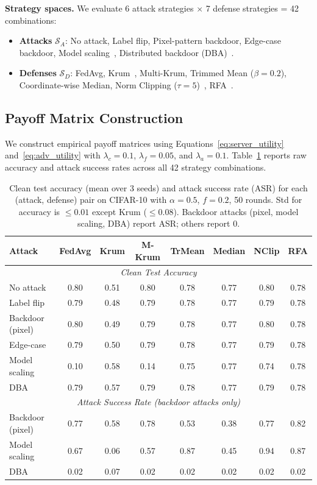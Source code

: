 \documentclass{article}
\newcommand{\SA}{\mathcal{S}_A}
\newcommand{\SD}{\mathcal{S}_D}
\begin{document}
\textbf{Strategy spaces.} We evaluate 6 attack strategies $\times$ 7 defense strategies = 42 combinations:
\begin{itemize}
    \item \textbf{Attacks} $\SA$: No attack, Label flip, Pixel-pattern backdoor, Edge-case backdoor, Model scaling~\citep{bagdasaryan2020backdoor}, Distributed backdoor (DBA)~\citep{xie2019dba}.
    \item \textbf{Defenses} $\SD$: FedAvg, Krum~\citep{blanchard2017machine}, Multi-Krum, Trimmed Mean ($\beta=0.2$), Coordinate-wise Median, Norm Clipping ($\tau=5$)~\citep{sun2019can}, RFA~\citep{pillutla2019robust}.
\end{itemize}

\subsection{Payoff Matrix Construction}

We construct empirical payoff matrices using Equations~\ref{eq:server_utility} and~\ref{eq:adv_utility} with $\lambda_c = 0.1$, $\lambda_f = 0.05$, and $\lambda_a = 0.1$. Table~\ref{tab:accuracy} reports raw accuracy and attack success rates across all 42 strategy combinations.

\begin{table}[t]
\caption{Clean test accuracy (mean over 3 seeds) and attack success rate (ASR) for each (attack, defense) pair on CIFAR-10 with $\alpha=0.5$, $f=0.2$, 50 rounds. Std for accuracy is ${\leq}0.01$ except Krum (${\leq}0.08$). Backdoor attacks (pixel, model scaling, DBA) report ASR; others report 0.}
\label{tab:accuracy}
\centering
\small
\begin{tabular}{l|ccccccc}
\toprule
\textbf{Attack} & FedAvg & Krum & M-Krum & TrMean & Median & NClip & RFA \\
\midrule
\multicolumn{8}{c}{\textit{Clean Test Accuracy}} \\
\midrule
No attack      & 0.80 & 0.51 & 0.80 & 0.78 & 0.77 & 0.80 & 0.78 \\
Label flip     & 0.79 & 0.48 & 0.79 & 0.78 & 0.77 & 0.79 & 0.78 \\
Backdoor (pixel) & 0.80 & 0.49 & 0.79 & 0.78 & 0.77 & 0.80 & 0.78 \\
Edge-case      & 0.79 & 0.50 & 0.79 & 0.78 & 0.77 & 0.79 & 0.78 \\
Model scaling  & 0.10 & 0.58 & 0.14 & 0.75 & 0.77 & 0.74 & 0.78 \\
DBA            & 0.79 & 0.57 & 0.79 & 0.78 & 0.77 & 0.79 & 0.78 \\
\midrule
\multicolumn{8}{c}{\textit{Attack Success Rate (backdoor attacks only)}} \\
\midrule
Backdoor (pixel) & 0.77 & 0.58 & 0.78 & 0.53 & 0.38 & 0.77 & 0.82 \\
Model scaling    & 0.67 & 0.06 & 0.57 & 0.87 & 0.45 & 0.94 & 0.87 \\
DBA              & 0.02 & 0.07 & 0.02 & 0.02 & 0.02 & 0.02 & 0.02 \\
\bottomrule
\end{tabular}
\end{table}
\end{document}
